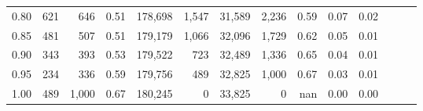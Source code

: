 \begin{tabular}{rrrrrrrrrrrrrr}
0.80 &     621 &    646 &  0.51 &  178,698 &    1,547 &  31,589 &   2,236 &  0.59 &  0.07 &      0.02 \\
0.85 &     481 &    507 &  0.51 &  179,179 &    1,066 &  32,096 &   1,729 &  0.62 &  0.05 &      0.01 \\
0.90 &     343 &    393 &  0.53 &  179,522 &      723 &  32,489 &   1,336 &  0.65 &  0.04 &      0.01 \\
0.95 &     234 &    336 &  0.59 &  179,756 &      489 &  32,825 &   1,000 &  0.67 &  0.03 &      0.01 \\
1.00 &     489 &  1,000 &  0.67 &  180,245 &        0 &  33,825 &       0 &   nan &  0.00 &      0.00 \\
\bottomrule
\end{tabular}
